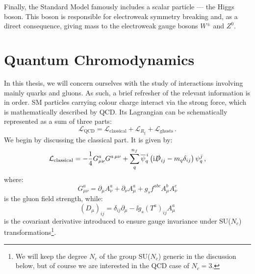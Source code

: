\documentclass[main.tex]{subfiles}
\begin{document}
Finally, the Standard Model famously includes a scalar particle --- the Higgs boson. This boson is responsible for electroweak symmetry breaking and, as a direct consequence, giving mass to the electroweak gauge bosons $W^\pm$ and $Z^0$. 
\section{Quantum Chromodynamics} \label{sec:QCD}
In this thesis, we will concern ourselves with the study of interactions involving mainly quarks and gluons. As such, a brief refresher of the relevant information is in order. SM particles carrying colour charge interact via the strong force, which is mathematically described by QCD. Its Lagrangian can be schematically represented as a sum of three parts:
\begin{equation}
    \mathcal{L}_{\text{QCD}} = \mathcal{L}_{\text{classical}} + \mathcal{L}_{R_\xi} + \mathcal{L}_{\text{ghosts}}\,.
\end{equation}
We begin by discussing the classical part. It is given by:
\begin{equation} \label{eq:QCDLagrangian}
    \mathcal{L}_{\text{classical}} = -\frac{1}{4} G^a_{\mu\nu} G^{a\,\mu\nu} + \sum_q^{n_f} \overline{\psi}_{q}^{\,i} \left(\mathrm{i} \slashed{D}_{ij} - m_q \delta_{ij} \right) \psi_q^j\,,
\end{equation}
where:
\begin{equation}
     G^a_{\mu\nu} = \partial_\mu A^a_\nu + \partial_\nu A^a_\mu + g_s f^{abc} A^b_\mu A^c_\nu
\end{equation}
is the gluon field strength, while:
\begin{equation}
    (D_\mu)_{ij} = \delta_{ij} \partial_\mu - \ii g_s (T^a)_{ij} A^a_\mu
\end{equation}
is the covariant derivative introduced to ensure gauge invariance under SU($N_c$) transformations\footnote{We will keep the degree $N_c$ of the group SU($N_c$) generic in the discussion below, but of course we are interested in the QCD case of $N_c=3$.}.
\end{document}
